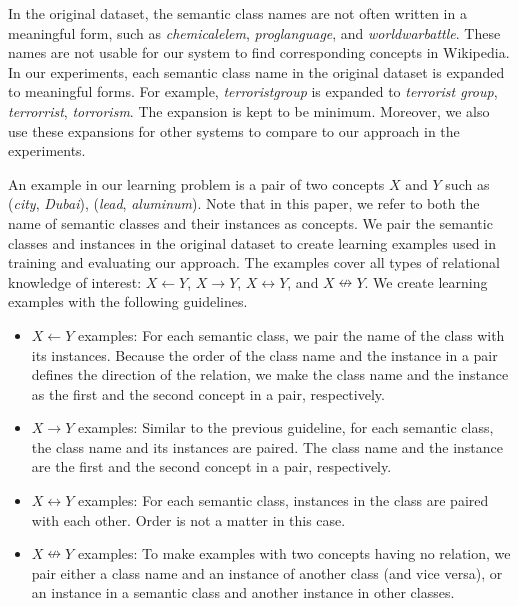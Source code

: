 In the original dataset, the semantic class names are not often
written in a meaningful form, such as {\em chemicalelem}, {\em
  proglanguage}, and {\em worldwarbattle}. These names are not usable
for our system to find corresponding concepts in Wikipedia. In our
experiments, each semantic class name in the original dataset is
expanded to meaningful forms. For example, {\em terroristgroup} is
expanded to {{\em terrorist group}, {\em terrorrist}, {\em
    torrorism}}. The expansion is kept to be minimum. Moreover, we
also use these expansions for other systems to compare to our approach
in the experiments.


An example in our learning problem is a pair of two concepts $X$ and
$Y$ such as ({\em city}, {\em Dubai}), ({\em lead}, {\em
  aluminum}). Note that in this paper, we refer to both the name of
semantic classes and their instances as concepts. We pair the semantic
classes and instances in the original dataset to create learning examples used
in training and evaluating our approach. The examples cover all types
of relational knowledge of interest: $X \leftarrow Y$, $X \rightarrow
Y$, $X \leftrightarrow Y$, and $X \nleftrightarrow Y$. We create
learning examples with the following guidelines.

\begin{itemize}
\item $X \leftarrow Y$ examples: For each semantic class, we pair the
  name of the class with its instances. Because the order of the class
  name and the instance in a pair defines the direction of the
  relation, we make the class name and the instance as the first and
  the second concept in a pair, respectively.
\item $X \rightarrow Y$ examples: Similar to the previous guideline,
  for each semantic class, the class name and its instances are
  paired. The class name and the instance are the first and the second
  concept in a pair, respectively.
\item $X \leftrightarrow Y$ examples: For each semantic class,
  instances in the class are paired with each other. Order is not a
  matter in this case.
\item $X \nleftrightarrow Y$ examples: To make examples with two
  concepts having no relation, we pair either a class name and an
  instance of another class (and vice versa), or an instance in a
  semantic class and another instance in other classes.
\end{itemize}


